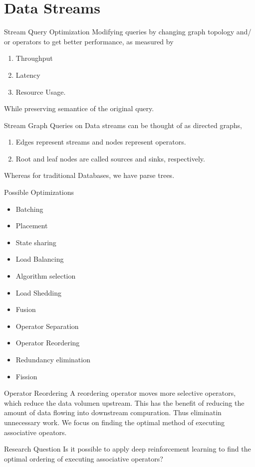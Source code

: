 \section{Data Streams}
\frame{\sectionpage}

\begin{frame}{Stream Query Optimization}
    Modifying queries by changing graph topology and/ or operators to get better performance, as measured by
    \begin{enumerate}
        \item Throughput
        \item Latency
        \item Resource Usage.
    \end{enumerate}
    While preserving semantice of the original query.
\end{frame}

\begin{frame}{Stream Graph}
    Queries on Data streams can be thought of as directed graphs,
    \begin{enumerate}
    \item Edges represent streams and nodes represent operators.
    \item Root  and  leaf nodes are called sources and sinks, respectively.
    \end{enumerate}
    Whereas for traditional Databases, we have parse trees.
\end{frame}

\begin{frame}{Possible Optimizations}
    \begin{itemize}
        \item Batching
        \item Placement
        \item State sharing
        \item Load Balancing
        \item Algorithm selection
        \item Load Shedding
        \item Fusion
        \item Operator Separation
        \item Operator Reordering
        \item Redundancy elimination
        \item Fission
    \end{itemize}
\end{frame}

\begin{frame}{Operator Reordering}
    A reordering operator moves more selective operators, which reduce the data volumen upstream. This has the benefit of reducing the amount of data flowing into downstream compuration. Thus eliminatin unnecessary work. 
    We focus on finding the optimal method of executing associative opeators.
\end{frame}

\begin{frame}{Research Question}
    Is it possible to apply deep reinforcement learning to find the optimal ordering of executing associative operators?
\end{frame}
